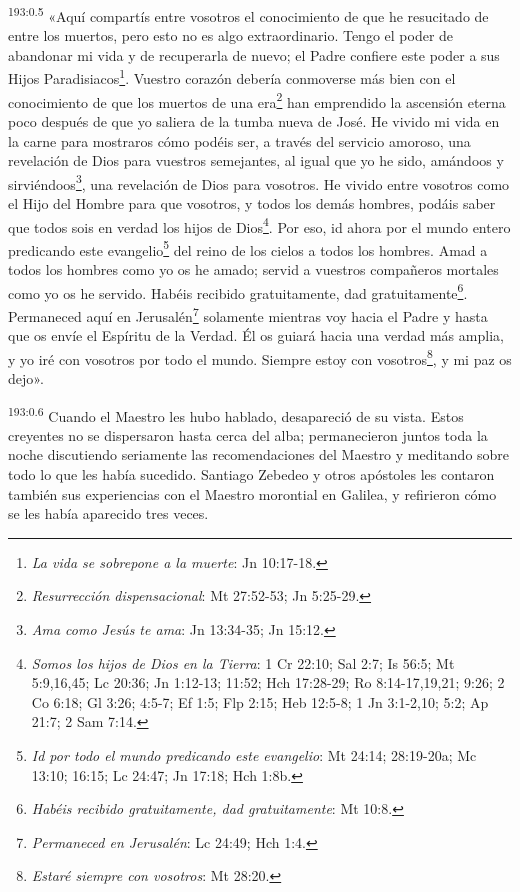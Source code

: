 \par 
\textsuperscript{193:0.5} «Aquí compartís entre vosotros el conocimiento de que he resucitado de entre los muertos, pero esto no es algo extraordinario. Tengo el poder de abandonar mi vida y de recuperarla de nuevo; el Padre confiere este poder a sus Hijos Paradisiacos\footnote{\textit{La vida se sobrepone a la muerte}: Jn 10:17-18.}. Vuestro corazón debería conmoverse más bien con el conocimiento de que los muertos de una era\footnote{\textit{Resurrección dispensacional}: Mt 27:52-53; Jn 5:25-29.} han emprendido la ascensión eterna poco después de que yo saliera de la tumba nueva de José. He vivido mi vida en la carne para mostraros cómo podéis ser, a través del servicio amoroso, una revelación de Dios para vuestros semejantes, al igual que yo he sido, amándoos y sirviéndoos\footnote{\textit{Ama como Jesús te ama}: Jn 13:34-35; Jn 15:12.}, una revelación de Dios para vosotros. He vivido entre vosotros como el Hijo del Hombre para que vosotros, y todos los demás hombres, podáis saber que todos sois en verdad los hijos de Dios\footnote{\textit{Somos los hijos de Dios en la Tierra}: 1 Cr 22:10; Sal 2:7; Is 56:5; Mt 5:9,16,45; Lc 20:36; Jn 1:12-13; 11:52; Hch 17:28-29; Ro 8:14-17,19,21; 9:26; 2 Co 6:18; Gl 3:26; 4:5-7; Ef 1:5; Flp 2:15; Heb 12:5-8; 1 Jn 3:1-2,10; 5:2; Ap 21:7; 2 Sam 7:14.}. Por eso, id ahora por el mundo entero predicando este evangelio\footnote{\textit{Id por todo el mundo predicando este evangelio}: Mt 24:14; 28:19-20a; Mc 13:10; 16:15; Lc 24:47; Jn 17:18; Hch 1:8b.} del reino de los cielos a todos los hombres. Amad a todos los hombres como yo os he amado; servid a vuestros compañeros mortales como yo os he servido. Habéis recibido gratuitamente, dad gratuitamente\footnote{\textit{Habéis recibido gratuitamente, dad gratuitamente}: Mt 10:8.}. Permaneced aquí en Jerusalén\footnote{\textit{Permaneced en Jerusalén}: Lc 24:49; Hch 1:4.} solamente mientras voy hacia el Padre y hasta que os envíe el Espíritu de la Verdad. Él os guiará hacia una verdad más amplia, y yo iré con vosotros por todo el mundo. Siempre estoy con vosotros\footnote{\textit{Estaré siempre con vosotros}: Mt 28:20.}, y mi paz os dejo».

\par 
\textsuperscript{193:0.6} Cuando el Maestro les hubo hablado, desapareció de su vista. Estos creyentes no se dispersaron hasta cerca del alba; permanecieron juntos toda la noche discutiendo seriamente las recomendaciones del Maestro y meditando sobre todo lo que les había sucedido. Santiago Zebedeo y otros apóstoles les contaron también sus experiencias con el Maestro morontial en Galilea, y refirieron cómo se les había aparecido tres veces.

